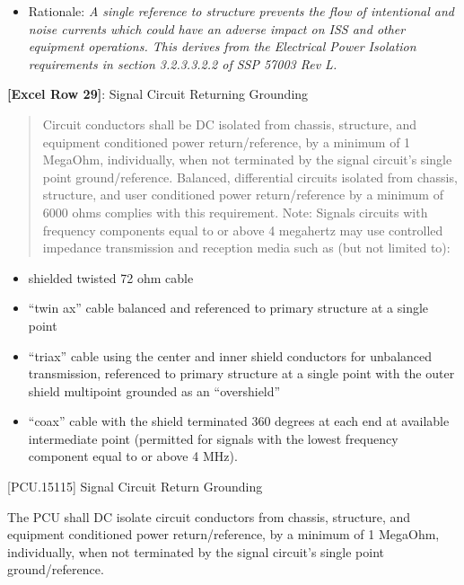 \begin{itemize}
\item{} Rationale: \emph{A single reference to structure prevents the flow of intentional and noise currents which could have an adverse impact on ISS and other equipment operations. This derives from the Electrical Power Isolation requirements in section 3.2.3.3.2.2 of SSP 57003 Rev L.}

\end{itemize}

\textbf{[Excel Row 29]}: Signal Circuit Returning Grounding

\begin{quote}
Circuit conductors shall be DC isolated from chassis, structure, and equipment conditioned power return\slash reference, by a minimum of 1 MegaOhm, individually, when not terminated by the signal circuit's single point ground\slash reference. Balanced, differential circuits isolated from chassis, structure, and user conditioned power return\slash reference by a minimum of 6000 ohms complies with this requirement.
Note: Signals circuits with frequency components equal to or above 4 megahertz may use controlled impedance transmission and reception media such as (but not limited to):
\end{quote}

\begin{itemize}
\item{} shielded twisted 72 ohm cable

\item{} ``twin ax'' cable balanced and referenced to primary structure at a single point

\item{} ``triax'' cable using the center and inner shield conductors for unbalanced transmission, referenced to primary structure at a single point with the outer shield multipoint grounded as an ``overshield''

\item{} ``coax'' cable with the shield terminated 360 degrees at each end at available intermediate point (permitted for signals with the lowest frequency component equal to or above 4 MHz).

\end{itemize}

[PCU.15115] Signal Circuit Return Grounding

The PCU shall DC isolate circuit conductors from chassis, structure, and equipment conditioned power return\slash reference, by a minimum of 1 MegaOhm, individually, when not terminated by the signal circuit's single point ground\slash reference.

